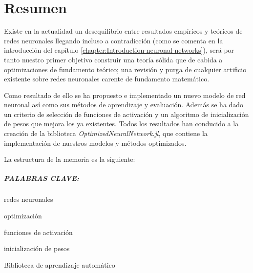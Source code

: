 %


\chapter*{Resumen}\label{ch:resumen}

Existe en la actualidad un desequilibrio entre resultados empíricos 
y teóricos de redes neuronales llegando incluso a contradicción
 (como se comenta en la introducción del capítulo 
 \ref{chapter:Introduction-neuronal-networks}), será por tanto
nuestro primer objetivo construir una teoría sólida
que de cabida a 
 optimizaciones de fundamento teórico; 
una revisión y
 purga de cualquier artificio existente sobre 
 redes neuronales carente de fundamento matemático. 

Como resultado de ello se ha propuesto e implementado 
un nuevo modelo de red neuronal así como sus 
métodos de aprendizaje y evaluación. 
Además se ha dado un criterio de selección de 
funciones de activación y un algoritmo de 
inicialización de pesos que mejora los ya existentes. 
Todos los resultados han conducido a la creación de 
la biblioteca \textit{OptimizedNeuralNetwork.jl}, 
que contiene la implementación de nuestros modelos y
 métodos optimizados. 


La estructura de la memoria es la siguiente: 


\paragraph{PALABRAS CLAVE:}
\begin{itemize*}[label=,itemsep=1em,itemjoin=\hspace{1em}]
  \item redes neuronales
  \item optimización 
  \item funciones de activación 
  \item inicialización de pesos
  \item Biblioteca de aprendizaje automático
\end{itemize*}

\endinput
